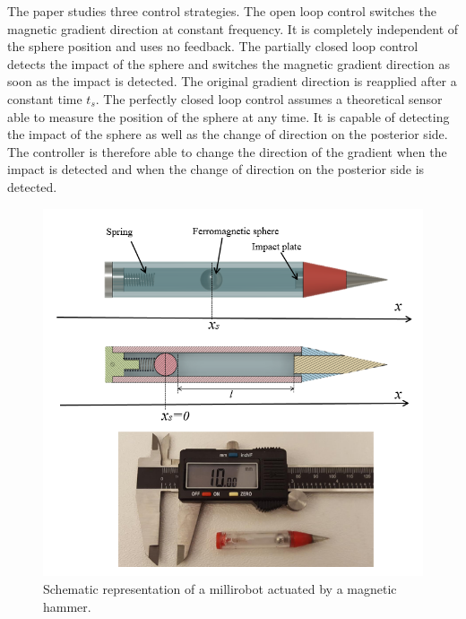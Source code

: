 \documentclass[letterpaper, 10 pt, conference]{ieeeconf}  %
\begin{document}
The paper studies three control strategies. The open loop control switches the magnetic gradient direction at constant frequency. It is completely independent of the sphere position and uses no feedback. The partially closed loop control detects the impact of the sphere and switches the magnetic gradient direction as soon as the impact is detected. The original gradient direction is reapplied after a constant time $t_s$. The perfectly closed loop control assumes a theoretical sensor able to measure the position of the sphere at any time. It is capable of detecting the impact of the sphere as well as the change of direction on the posterior side. The controller is therefore able to change the direction of the gradient when the impact is detected and when the change of direction on the posterior side is detected.\par


\begin{figure}
  \includegraphics[width=\linewidth]{figure1-2.png}
  \caption{Schematic representation of a millirobot actuated by a magnetic hammer.}
  \label{millirobot}
  \vspace{-2em}
\end{figure}
\end{document}
